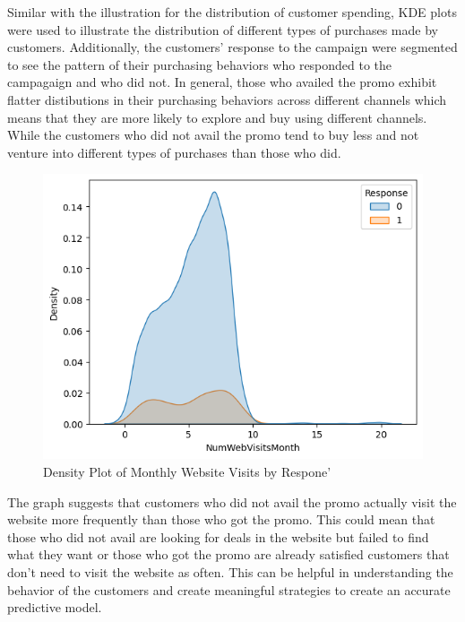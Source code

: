 Similar with the illustration for the distribution of customer spending, KDE plots were used to illustrate the distribution of different types of purchases made by customers. Additionally, the customers' response to the campaign were segmented to see the pattern of their purchasing behaviors who responded to the campagaign and who did not. In general, those who availed the promo exhibit flatter distibutions in their purchasing behaviors across different channels which means that they are more likely to explore and buy using different channels. While the customers who did not avail the promo tend to buy less and not venture into different types of purchases than those who did.

\begin{figure}[H]
    \centering
    \includegraphics[width=\linewidth]{figures/numwebvisits.png}
    \caption{Density Plot of Monthly Website Visits by Respone'}
    \label{fig:income hist}
\end{figure}

The graph suggests that customers who did not avail the promo actually visit the website more frequently than those who got the promo. This could mean that those who did not avail are looking for deals in the website but failed to find what they want or those who got the promo are already satisfied customers that don't need to visit the website as often. This can be helpful in understanding the behavior of the customers and create meaningful strategies to create an accurate predictive model.
